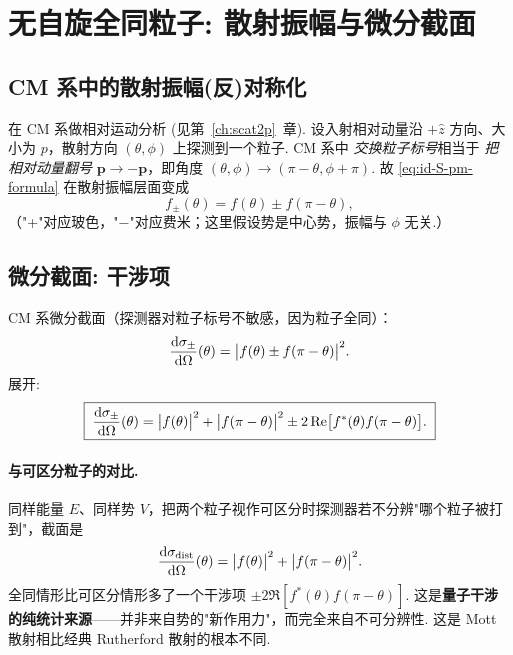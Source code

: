 \section{无自旋全同粒子: 散射振幅与微分截面}\label{sec:id-spinless}

\subsection{CM 系中的散射振幅(反)对称化}\label{sec:id-fpm}

在 CM 系做相对运动分析 (见第~\ref{ch:scat2p}~章). 设入射相对动量沿 $+\hat z$ 方向、大小为 $p$，散射方向 $(\theta,\phi)$ 上探测到一个粒子. CM 系中 \emph{交换粒子标号}相当于 \emph{把相对动量翻号} $\bm p\to-\bm p$，即角度 $(\theta,\phi)\to(\pi-\theta,\phi+\pi)$. 故 \eqref{eq:id-S-pm-formula} 在散射振幅层面变成
\begin{equation}
  \boxed{\;f_\pm(\theta)=f(\theta)\pm f(\pi-\theta),\;}
  \label{eq:id-fpm}
\end{equation}
（"+"对应玻色，"−"对应费米；这里假设势是中心势，振幅与 $\phi$ 无关.）

\subsection{微分截面: 干涉项}\label{sec:id-dsigma}

CM 系微分截面（探测器对粒子标号不敏感，因为粒子全同）：
\begin{equation}
  \frac{\mathrm{d}\sigma_\pm}{\mathrm{d}\Omega}(\theta)
  =\bigl|f(\theta)\pm f(\pi-\theta)\bigr|^2.
  \label{eq:id-dsigma-pm}
\end{equation}
展开:
\begin{equation}
  \boxed{\;\frac{\mathrm{d}\sigma_\pm}{\mathrm{d}\Omega}(\theta)
  =\bigl|f(\theta)\bigr|^2+\bigl|f(\pi-\theta)\bigr|^2\pm 2\Re\bigl[f^*(\theta)f(\pi-\theta)\bigr].\;}
  \label{eq:id-dsigma-pm-expanded}
\end{equation}

\paragraph{与可区分粒子的对比.}\quad 同样能量 $E$、同样势 $V$，把两个粒子视作可区分时探测器若不分辨"哪个粒子被打到"，截面是
\begin{equation}
  \frac{\mathrm{d}\sigma_{\rm dist}}{\mathrm{d}\Omega}(\theta)
  =\bigl|f(\theta)\bigr|^2+\bigl|f(\pi-\theta)\bigr|^2.
  \label{eq:id-dist}
\end{equation}
全同情形比可区分情形多了一个干涉项 $\pm 2\Re[f^*(\theta)f(\pi-\theta)]$. 这是\textbf{量子干涉的纯统计来源}——并非来自势的"新作用力"，而完全来自不可分辨性. 这是 Mott 散射相比经典 Rutherford 散射的根本不同.

